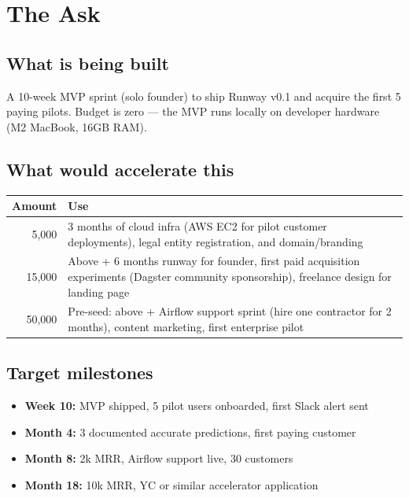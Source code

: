 
\section{The Ask}

\subsection{What is being built}

A 10-week MVP sprint (solo founder) to ship Runway v0.1 and acquire the first 5 paying pilots.
Budget is zero — the MVP runs locally on developer hardware (M2 MacBook, 16GB RAM).

\subsection{What would accelerate this}

\begin{center}
\small
\begin{tabularx}{0.96\textwidth}{r X}
  \toprule
  \textbf{Amount} & \textbf{Use} \\
  \midrule
  \texteuro{}5,000  & 3 months of cloud infra (AWS EC2 for pilot customer deployments),
                      legal entity registration, and domain/branding \\
  \texteuro{}15,000 & Above + 6 months runway for founder, first paid acquisition experiments
                      (Dagster community sponsorship), freelance design for landing page \\
  \texteuro{}50,000 & Pre-seed: above + Airflow support sprint (hire one contractor for 2 months),
                      content marketing, first enterprise pilot \\
  \bottomrule
\end{tabularx}
\end{center}

\subsection{Target milestones}

\begin{itemize}
  \item \textbf{Week 10:} MVP shipped, 5 pilot users onboarded, first Slack alert sent
  \item \textbf{Month 4:} 3 documented accurate predictions, first paying customer
  \item \textbf{Month 8:} \texteuro{}2k MRR, Airflow support live, 30 customers
  \item \textbf{Month 18:} \texteuro{}10k MRR, YC or similar accelerator application
\end{itemize}


